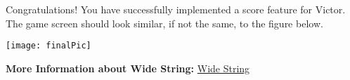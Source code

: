 \documentclass[11pt]{article}
\begin{document}
\bigskip

Congratulations! You have successfully implemented a score feature for Victor. The game screen should look similar, if not the same, to the figure below.  

\bigskip

\texttt{[image: finalPic]}
\centering 
\bigskip

\textbf{More Information about Wide String: } 
\href{http://www.cplusplus.com/reference/string/wstring/}{Wide String}
\end{document}
